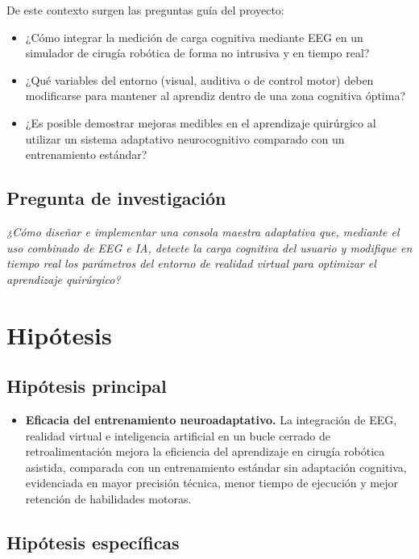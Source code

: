 \documentclass[12pt]{article}
\begin{document}
De este contexto surgen las preguntas guía del proyecto:
\begin{itemize}
    \item ¿Cómo integrar la medición de carga cognitiva mediante
    EEG en un simulador de cirugía robótica de forma no intrusiva
    y en tiempo real?
    \item ¿Qué variables del entorno (visual, auditiva o de
    control motor) deben modificarse para mantener al aprendiz
    dentro de una zona cognitiva óptima?
    \item ¿Es posible demostrar mejoras medibles en el aprendizaje
    quirúrgico al utilizar un sistema adaptativo neurocognitivo
    comparado con un entrenamiento estándar?
\end{itemize}

\subsection*{Pregunta de investigación}

\textit{¿Cómo diseñar e implementar una consola maestra adaptativa
que, mediante el uso combinado de EEG e IA, detecte la carga
cognitiva del usuario y modifique en tiempo real los parámetros
del entorno de realidad virtual para optimizar el aprendizaje
quirúrgico?}


\section{Hipótesis}

\subsection*{Hipótesis principal}

\begin{itemize}
    \item[\textbf{H1.}] \textbf{Eficacia del entrenamiento
    neuroadaptativo.} La integración de EEG, realidad virtual e
    inteligencia artificial en un bucle cerrado de
    retroalimentación mejora la eficiencia del aprendizaje en
    cirugía robótica asistida, comparada con un entrenamiento
    estándar sin adaptación cognitiva, evidenciada en mayor
    precisión técnica, menor tiempo de ejecución y mejor retención
    de habilidades motoras.
\end{itemize}

\subsection*{Hipótesis específicas}
\end{document}
